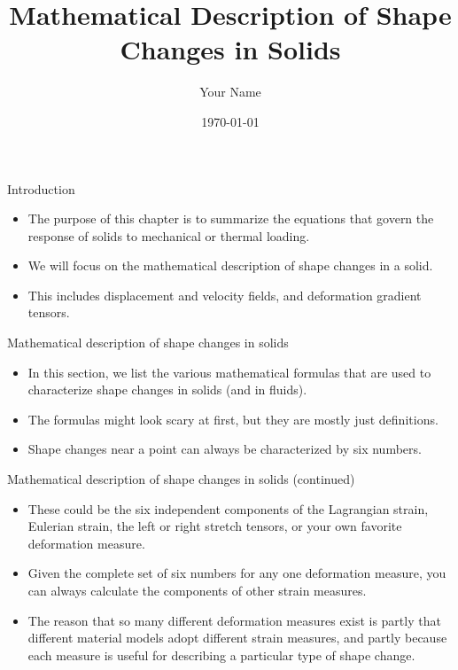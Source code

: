 \documentclass{beamer}
\title{Mathematical Description of Shape Changes in Solids}
\author{Your Name}
\date{\today}
\begin{document}
\begin{frame}
  \titlepage
\end{frame}

\begin{frame}{Introduction}
  \begin{itemize}
    \item   The purpose of this chapter is to summarize the equations that govern the response of solids to mechanical or thermal loading.
    \item   We will focus on the mathematical description of shape changes in a solid.
    \item   This includes displacement and velocity fields, and deformation gradient tensors.
  \end{itemize}
\end{frame}

\begin{frame}{Mathematical description of shape changes in solids}
    \begin{itemize}
        \item   In this section, we list the various mathematical formulas that are used to characterize shape changes in solids (and in fluids).
        \item   The formulas might look scary at first, but they are mostly just definitions.
        \item   Shape changes near a point can always be characterized by six numbers.
    \end{itemize}
\end{frame}

\begin{frame}{Mathematical description of shape changes in solids (continued)}
    \begin{itemize}
        \item   These could be the six independent components of the Lagrangian strain, Eulerian strain, the left or right stretch tensors, or your own favorite deformation measure.
        \item   Given the complete set of six numbers for any one deformation measure, you can always calculate the components of other strain measures.
        \item   The reason that so many different deformation measures exist is partly that different material models adopt different strain measures, and partly because each measure is useful for describing a particular type of shape change.
    \end{itemize}
\end{frame}
\end{document}
